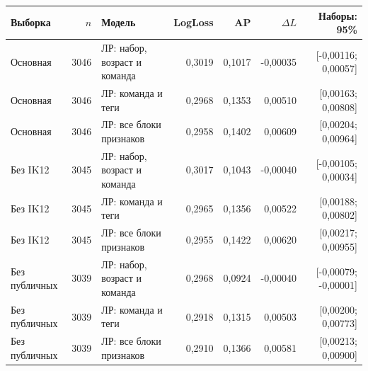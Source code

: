 \begin{tabular}{@{}l r >{\raggedright\arraybackslash}p{3.2cm}rrrr@{}}
\toprule
Выборка & $n$ & Модель & LogLoss & AP & $\Delta L$ & Наборы: 95\% \\
\midrule
Основная & 3046 & ЛР: набор, возраст и команда & 0,3019 & 0,1017 & -0,00035 & [-0,00116; 0,00057] \\
Основная & 3046 & ЛР: команда и теги & 0,2968 & 0,1353 & 0,00510 & [0,00163; 0,00808] \\
Основная & 3046 & ЛР: все блоки признаков & 0,2958 & 0,1402 & 0,00609 & [0,00204; 0,00964] \\
Без IK12 & 3045 & ЛР: набор, возраст и команда & 0,3017 & 0,1043 & -0,00040 & [-0,00105; 0,00034] \\
Без IK12 & 3045 & ЛР: команда и теги & 0,2965 & 0,1356 & 0,00522 & [0,00188; 0,00802] \\
Без IK12 & 3045 & ЛР: все блоки признаков & 0,2955 & 0,1422 & 0,00620 & [0,00217; 0,00955] \\
Без публичных & 3039 & ЛР: набор, возраст и команда & 0,2968 & 0,0924 & -0,00040 & [-0,00079; -0,00001] \\
Без публичных & 3039 & ЛР: команда и теги & 0,2918 & 0,1315 & 0,00503 & [0,00200; 0,00773] \\
Без публичных & 3039 & ЛР: все блоки признаков & 0,2910 & 0,1366 & 0,00581 & [0,00213; 0,00900] \\
\bottomrule
\end{tabular}
